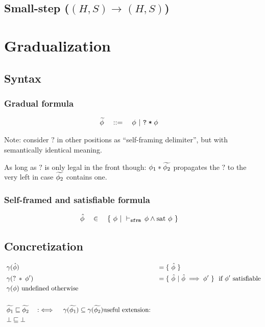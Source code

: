 \documentclass[11pt,a4paper]{article}
\begin{document}
\newcommand{\dType}[4]{#1, #2 \vdash #3 : #4}

\newcommand{\sstepGeneric}[5]{({#1}, {#2}) \rightarrow^{#3} ({#4}, {#5})}
\newcommand{\sstep}[4]{\sstepGeneric {#1} {#2} {} {#3} {#4}}
\newcommand{\sstepM}[4]{\sstepGeneric {#1} {#2} * {#3} {#4}} 
\newcommand{\sstepWS}[4]{\sstepGeneric {#1} {{#2} \cdot S} {} {#3} {{#4} \cdot S}}
\newcommand{\sstepWSX}[8]{\sstepGeneric {#1} {({#2},{#3},{#4}) \cdot S} {} {#5} {({#6},{#7},{#8}) \cdot S}}

\newcommand{\Tfs}{\overline{T}~\overline{f}}
\subsection{Small-step ($\sstep H S H S$)}

%

\section{Gradualization}
\subsection{Syntax}
\subsubsection{Gradual formula}
\begin{align*}
&\widetilde{\phi} \quad ::= \quad \phi ~|~ \texttt{\texttt{?}\:*\:$\phi$}
\end{align*}

Note: consider $?$ in other positions as ``self-framing delimiter'', but with semantically identical meaning.

As long as $?$ is only legal in the front though: $\phi_1 * \widetilde{\phi_2}$ propagates the $?$ to the very left in case $\widetilde{\phi_2}$ contains one.

\subsubsection{Self-framed and satisfiable formula}
\begin{align*}
&\hat{\phi} \quad \in \quad \{~ \phi ~|~ \vdash_\texttt{sfrm}\, \phi \wedge \text{sat~} \phi ~\}
\end{align*}

\subsection{Concretization}
\begin{align*}
&\gamma(\hat{\phi}) ~&&= \{~ \hat{\phi} ~\} \\
&\gamma(?\:*\:\phi') ~&&= \{~ \hat{\phi} ~|~ \hat{\phi} \implies \phi' ~\} \text{~~if $\phi'$ satisfiable} \\
&\gamma(\phi) \text{ undefined otherwise} \\
~\\
&\widetilde{\phi_1} \sqsubseteq \widetilde{\phi_2} \quad:\iff\quad \gamma(\widetilde{\phi_1}) \subseteq \gamma(\widetilde{\phi_2})
\text{useful extension:}\\
&\bot \sqsubseteq \bot
\end{align*}
\end{document}
